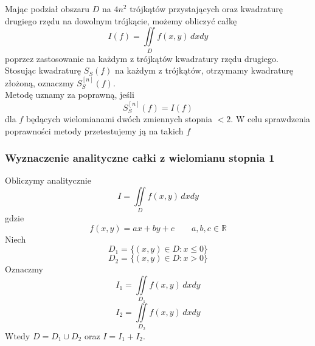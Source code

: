 \documentclass[9pt]{beamer}
\begin{document}
\begin{frame}
	 \begin{spacing}{1.5}
	Mając podział obszaru $ D $ na $4 n^2 $ trójkątów przystających oraz kwadraturę drugiego rzędu na dowolnym trójkącie, możemy obliczyć całkę $$ I(f) = \iint\limits_D f(x,y)  \, dxdy $$ poprzez zastosowanie na każdym z trójkątów kwadratury rzędu drugiego.\\
	
	Stosując kwadraturę $ S_S(f) $ na każdym z trójkątów, 
	otrzymamy kwadraturę złożoną, oznaczmy $ S_S^{[n]}(f) $.\\
   
    Metodę uznamy za poprawną, jeśli 
    $$ S_S^{[n]}(f) = I(f) $$
    dla $f$ będących wielomianami dwóch zmiennych stopnia $ < 2$. 
	W celu sprawdzenia poprawności metody przetestujemy ją na takich $f$ \par
	

	\end{spacing}
\end{frame}

\begin{frame}
\frametitle{Wyznaczenie analityczne całki z wielomianu stopnia 1}

    \begin{spacing}{1}
        Obliczymy analitycznie 
        $$ I = \iint\limits_D f(x,y) \, dx dy $$ 
        gdzie
        $$ f(x,y) = ax + by + c \qquad a,b,c \in \mathbb{R}$$
        Niech 
        $$ D_1 = \{(x,y) \in D : x \leq 0\} $$ 
        $$ D_2 = \{(x,y) \in D : x > 0\} $$ 
        Oznaczmy 
        $$ I_1 = \iint\limits_{D_1} f(x,y) \, dx dy $$ 
        $$ I_2 = \iint\limits_{D_2} f(x,y) \, dx dy $$ 
        Wtedy $ D = D_1 \cup D_2 $ oraz $ I = I_1 + I_2 $.
    \end{spacing}

\end{frame}
\end{document}
